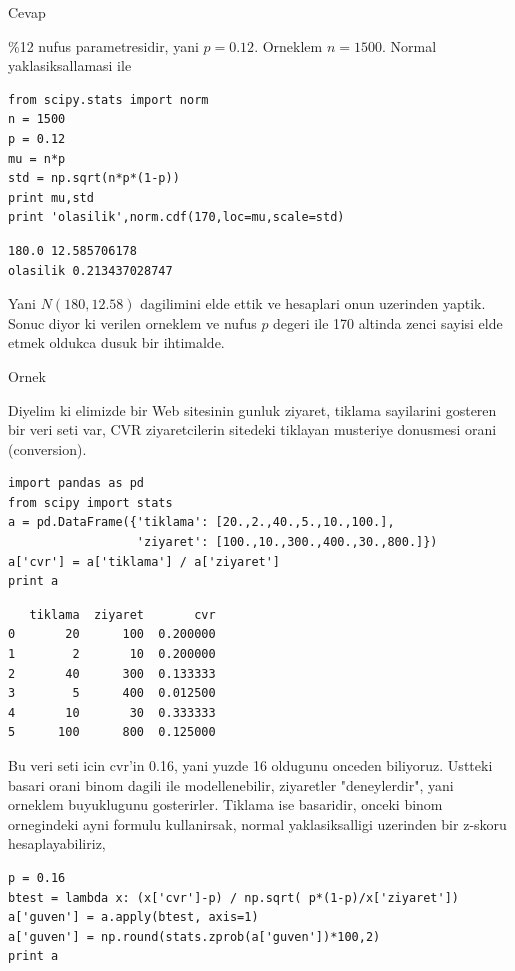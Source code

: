 \documentclass[12pt,fleqn]{article}\usepackage{../common}
\begin{document}
Cevap

\%12 nufus parametresidir, yani $p=0.12$. Orneklem $n=1500$. Normal
yaklasiksallamasi ile 

\begin{verbatim}
from scipy.stats import norm
n = 1500
p = 0.12
mu = n*p
std = np.sqrt(n*p*(1-p))
print mu,std
print 'olasilik',norm.cdf(170,loc=mu,scale=std)
\end{verbatim}

\begin{verbatim}
180.0 12.585706178
olasilik 0.213437028747
\end{verbatim}

Yani $N(180,12.58)$ dagilimini elde ettik ve hesaplari onun uzerinden
yaptik. Sonuc diyor ki verilen orneklem ve nufus $p$ degeri ile 170 altinda
zenci sayisi elde etmek oldukca dusuk bir ihtimalde. 

Ornek

Diyelim ki elimizde bir Web sitesinin gunluk ziyaret, tiklama sayilarini
gosteren bir veri seti var, CVR ziyaretcilerin sitedeki tiklayan musteriye
donusmesi orani (conversion). 

\begin{verbatim}
import pandas as pd
from scipy import stats
a = pd.DataFrame({'tiklama': [20.,2.,40.,5.,10.,100.],
                  'ziyaret': [100.,10.,300.,400.,30.,800.]})
a['cvr'] = a['tiklama'] / a['ziyaret'] 
print a
\end{verbatim}

\begin{verbatim}
   tiklama  ziyaret       cvr
0       20      100  0.200000
1        2       10  0.200000
2       40      300  0.133333
3        5      400  0.012500
4       10       30  0.333333
5      100      800  0.125000
\end{verbatim}

Bu veri seti icin cvr'in 0.16, yani yuzde 16 oldugunu onceden
biliyoruz. Ustteki basari orani binom dagili ile modellenebilir, ziyaretler
"deneylerdir", yani orneklem buyuklugunu gosterirler. Tiklama ise
basaridir, onceki binom ornegindeki ayni formulu kullanirsak, normal
yaklasiksalligi uzerinden bir z-skoru hesaplayabiliriz,

\begin{verbatim}
p = 0.16
btest = lambda x: (x['cvr']-p) / np.sqrt( p*(1-p)/x['ziyaret'])
a['guven'] = a.apply(btest, axis=1)
a['guven'] = np.round(stats.zprob(a['guven'])*100,2)
print a
\end{verbatim}
\end{document}
